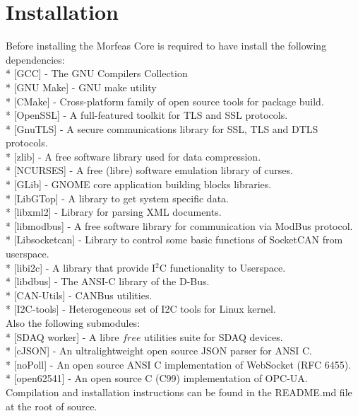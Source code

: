 \section{Installation}
Before installing the Morfeas Core is required to have install the following dependencies:\\
* [GCC] - The GNU Compilers Collection\\
* [GNU Make] - GNU make utility\\
* [CMake] - Cross-platform family of open source tools for package build.\\
* [OpenSSL] - A full-featured toolkit for TLS and SSL protocols.\\
* [GnuTLS] - A secure communications library for SSL, TLS and DTLS protocols.\\
* [zlib] - A free software library used for data compression.\\
* [NCURSES] - A free (libre) software emulation library of curses.\\
* [GLib] - GNOME core application building blocks libraries.\\
* [LibGTop] - A library to get system specific data.\\
* [libxml2] - Library for parsing XML documents.\\
* [libmodbus] - A free software library for communication via ModBus protocol.\\
* [Libsocketcan] - Library to control some basic functions of SocketCAN from userspace.\\
* [libi2c] - A library that provide I$^2$C functionality to Userspace.\\
* [libdbus] - The ANSI-C library of the D-Bus.\\
* [CAN-Utils] - CANBus utilities.\\
* [I2C-tools] - Heterogeneous set of I2C tools for Linux kernel.\\
Also the following submodules:\\
* [SDAQ worker] - A libre \(free\) utilities suite for SDAQ devices.\\
* [cJSON] - An ultralightweight open source JSON parser for ANSI C.\\
* [noPoll] - An open source ANSI C implementation of WebSocket (RFC 6455).\\
* [open62541] - An open source C (C99) implementation of OPC-UA.\\

Compilation and installation instructions can be found in the README.md file at the root of source.
